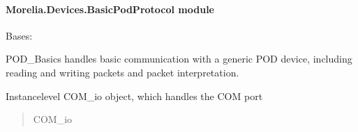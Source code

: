 \documentclass[letterpaper,10pt,english]{sphinxmanual}
\begin{document}
\paragraph{Morelia.Devices.BasicPodProtocol module}
\label{\detokenize{Morelia.Devices:module-Morelia.Devices.BasicPodProtocol}}\label{\detokenize{Morelia.Devices:morelia-devices-basicpodprotocol-module}}

\begin{fulllineitems}
\label{\detokenize{Morelia.Devices:Morelia.Devices.BasicPodProtocol.Pod}}
\pysigstartsignatures
{}
\pysigstopsignatures
\sphinxAtStartPar
Bases: 

\sphinxAtStartPar
POD\_Basics handles basic communication with a generic POD device, including reading and writing
packets and packet interpretation.

\begin{fulllineitems}
\label{\detokenize{Morelia.Devices:Morelia.Devices.BasicPodProtocol.Pod._port}}
\pysigstartsignatures
{}
\pysigstopsignatures
\sphinxAtStartPar
Instance\sphinxhyphen{}level COM\_io object, which handles the COM port
\begin{quote}\begin{description}
\sphinxAtStartPar
COM\_io

\end{description}\end{quote}

\end{fulllineitems}


\end{fulllineitems}
\end{document}
